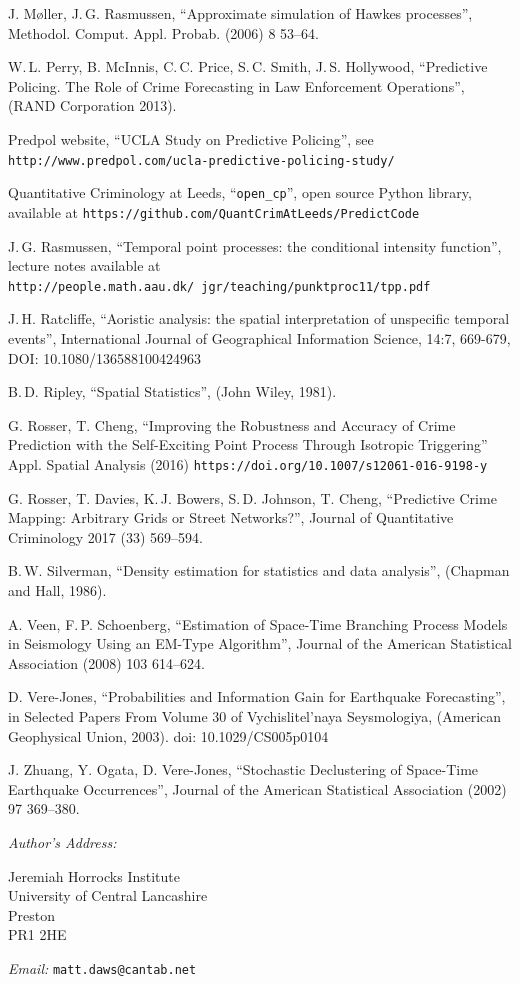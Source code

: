 \documentclass[twoside,a4paper]{article}
\theoremstyle{plain}
\theoremstyle{definition}
\begin{document}
\begin{thebibliography}{99}
 J. M\o ller, J.\,G. Rasmussen,
	``Approximate simulation of Hawkes processes'',
	Methodol. Comput. Appl. Probab. (2006) 8 53--64.

 W.\,L. Perry, B. McInnis, C.\,C. Price, S.\,C. Smith, J.\,S. Hollywood,
        ``Predictive Policing. The Role of Crime Forecasting in Law Enforcement Operations'',
        (RAND Corporation 2013).

 Predpol website, ``UCLA Study on Predictive Policing'',
	see \texttt{http://www.predpol.com/ucla-predictive-policing-study/}

 Quantitative Criminology at Leeds, ``\texttt{open\_cp}'',
   open source Python library, available at \texttt{https://github.com/QuantCrimAtLeeds/PredictCode}

 J.\,G. Rasmussen,
	``Temporal point processes: the conditional intensity function'',
	lecture notes available at \texttt{http://people.math.aau.dk/~jgr/teaching/punktproc11/tpp.pdf}

 J.\,H. Ratcliffe, ``Aoristic analysis: the spatial interpretation of unspecific
temporal events'', International Journal of Geographical Information Science, 14:7, 669-679, DOI:
10.1080/136588100424963

 B.\,D. Ripley,
	``Spatial Statistics'',
	(John Wiley, 1981).

 G. Rosser, T. Cheng, ``Improving the Robustness and Accuracy of Crime
	Prediction with the Self-Exciting Point Process Through Isotropic Triggering''
	Appl. Spatial Analysis (2016) \texttt{https://doi.org/10.1007/s12061-016-9198-y}

 G. Rosser, T. Davies, K.\,J. Bowers, S.\,D. Johnson, T. Cheng,
	``Predictive Crime Mapping: Arbitrary Grids or Street Networks?'',
	Journal of Quantitative Criminology 2017 (33) 569--594.

 B.\,W. Silverman,
	``Density estimation for statistics and data analysis'',
	(Chapman and Hall, 1986).

 A. Veen, F.\,P. Schoenberg,
	``Estimation of Space-Time Branching Process Models in Seismology Using an EM-Type Algorithm'',
	Journal of the American Statistical Association (2008) 103 614--624.

 D. Vere-Jones,
	``Probabilities and Information Gain for Earthquake Forecasting'',
	in Selected Papers From Volume 30 of Vychislitel'naya Seysmologiya,
	(American Geophysical Union, 2003).  doi: 10.1029/CS005p0104

 J. Zhuang, Y. Ogata, D. Vere-Jones,
	``Stochastic Declustering of Space-Time Earthquake Occurrences'',
	Journal of the American Statistical Association (2002) 97 369--380.

\end{thebibliography}


\vspace{5ex}

\noindent\emph{Author's Address:}
\parbox[t]{3in}{Jeremiah Horrocks Institute\\
University of Central Lancashire\\
Preston\\
PR1 2HE}

\bigskip\noindent\emph{Email:} \texttt{matt.daws@cantab.net}
\end{document}
